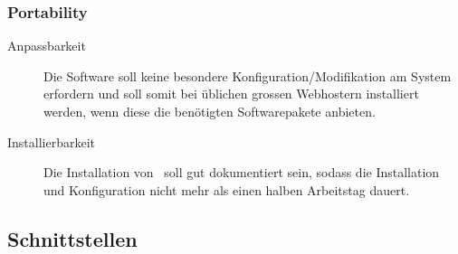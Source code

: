 		
		\subsubsection{Portability}
		\begin{description}
			\item[Anpassbarkeit] Die Software soll keine besondere Konfiguration/Modifikation am System erfordern und soll somit bei üblichen grossen Webhostern installiert werden, wenn diese die benötigten Softwarepakete anbieten.
			\item[Installierbarkeit] Die Installation von \eeppi\ soll gut dokumentiert sein, sodass die Installation und Konfiguration nicht mehr als einen halben Arbeitstag dauert.
		\end{description}

	\subsection{Schnittstellen}